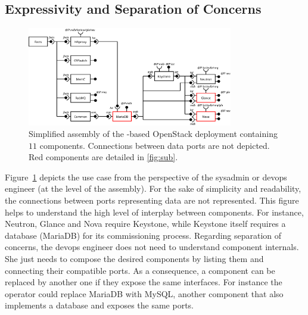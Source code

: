 \subsection{Expressivity and Separation of Concerns}

\begin{figure}
  \begin{center}
    \includegraphics[width=0.8\textwidth]{./images/full2.pdf}
    \caption{Simplified \mad assembly of the \kolla-based OpenStack deployment
    containing $11$ components. Connections between data ports are not depicted.
    Red components are detailed in \cref{fig:sub}.}
    \label{fig:full}
  \end{center}
\end{figure}

Figure~\ref{fig:full} depicts the use case from the perspective of the sysadmin or devops engineer 
(\ie at the level of the \mad assembly). For the sake of simplicity and 
readability, the connections between ports representing data are not represented. 
This figure helps to understand the high level of interplay between components. 
For instance, Neutron, Glance and Nova require Keystone, while Keystone itself requires 
a database (\ie MariaDB) for its commissioning process. Regarding
separation of concerns, the devops engineer does not need to understand component 
internals. She just needs to compose the desired components by listing them and 
connecting their compatible ports. As a consequence, a component can be replaced 
by another one if they expose the same interfaces. For instance the operator could 
replace MariaDB with MySQL, another component that also implements a database and
exposes the same ports.

